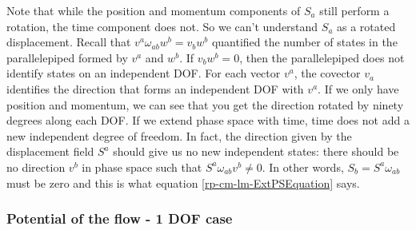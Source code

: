 Note that while the position and momentum components of $S_a$ still perform a rotation, the time component does not. So we can't understand $S_a$ as a rotated displacement. Recall that $v^a \omega_{ab} w^b = v_b w^b$ quantified the number of states in the parallelepiped formed by $v^a$ and $w^b$. If $v_b w^b = 0$, then the parallelepiped does not identify states on an independent DOF. For each vector $v^a$, the covector $v_a$ identifies the direction that forms an independent DOF with $v^a$. If we only have position and momentum, we can see that you get the direction rotated by ninety degrees along each DOF. If we extend phase space with time, time does not add a new independent degree of freedom. In fact, the direction given by the displacement field $S^a$ should give us no new independent states: there should be no direction $v^b$ in phase space such that $S^a \omega_{ab} v^b \neq 0$. In other words, $S_b = S^a \omega_{ab}$ must be zero and this is what equation \ref{rp-cm-lm-ExtPSEquation} says.

\subsubsection{Potential of the flow - 1 DOF case}

